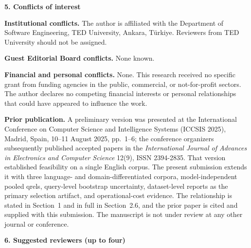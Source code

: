 \documentclass[10pt,a4paper]{article}
\newcommand{\q}[1]{\medskip\noindent\textbf{#1}\par\nopagebreak}
\begin{document}
\q{5. Conflicts of interest}

\textbf{Institutional conflicts.} The author is affiliated with the Department of Software
Engineering, TED University, Ankara, T\"urkiye. Reviewers from TED University should not be
assigned.

\textbf{Guest Editorial Board conflicts.} None known.

\textbf{Financial and personal conflicts.} None. This research received no specific grant from
funding agencies in the public, commercial, or not-for-profit sectors. The author declares no
competing financial interests or personal relationships that could have appeared to influence
the work.

\textbf{Prior publication.} A preliminary version was presented at the International Conference
on Computer Science and Intelligence Systems (ICCSIS 2025), Madrid, Spain, 10--11 August 2025,
pp.~1--6; the conference organizers subsequently published accepted papers in the
\emph{International Journal of Advances in Electronics and Computer Science} 12(9), ISSN
2394-2835. That version established feasibility on a single English corpus. The present
submission extends it with three language- and domain-differentiated corpora,
model-independent pooled qrels, query-level bootstrap uncertainty, dataset-level reports as the
primary selection artifact, and operational-cost evidence. The relationship is stated in
Section~1 and in full in Section~2.6, and the prior paper is cited and supplied with this
submission. The manuscript is not under review at any other journal or conference.

\q{6. Suggested reviewers (up to four)}
\end{document}
